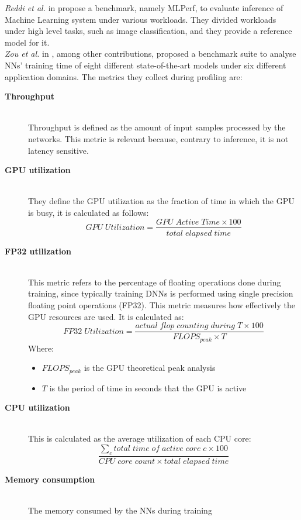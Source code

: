 \textit{Reddi et al.} in  \cite{reddi2020mlperf} propose a benchmark, namely MLPerf, to evaluate inference of Machine Learning system under various workloads. They divided workloads under high level tasks, such as image classification, and they provide a reference model for it. \\
\textit{Zou et al. } in \cite{8573476}, among other contributions, proposed a benchmark suite to analyse NNs' training time of eight different state-of-the-art models under six different application domains. The metrics they collect during profiling are:
\begin{description}
  \item[\textbf{Throughput}] \hfill\\ Throughput is defined as the amount of input samples processed by the networks. This metric is relevant because, contrary to inference, it is not latency sensitive.   
  \item[\textbf{GPU utilization}] \hfill \\ They define the GPU utilization as the fraction of time in which the GPU is busy, it is calculated as follows:
  \begin{equation}
      GPU\;Utilization = \dfrac{GPU\;Active\;Time\times100}{total\;elapsed\;time}%
  \end{equation}
  
  \item[\textbf{FP32 utilization}] \hfill \\ This metric refers to the percentage of floating operations done during training, since typically training DNNs is performed using single precision floating point operations (FP32). This metric measures how effectively the GPU resources are used. It is calculated as:
  \begin{equation}
      FP32\;Utilization = \dfrac{actual\;flop\;counting\;during\;T\times100}{FLOPS_{peak} \times T}%
  \end{equation}
  Where:
  \begin{itemize}
  \item $FLOPS_{peak}$ is the GPU theoretical peak analysis
  \item $T$ is the period of time in seconds that the GPU is active
  \end{itemize}
  \item[\textbf{CPU utilization }] \hfill\\ This is calculated as the average utilization of each CPU core:
  \begin{equation}
      \dfrac{\sum_{c} total\;time\;of\;active\;core\;c \times 100}{CPU\;core\;count \times total\;elapsed\;time}%
    \end{equation}   
    \item[\textbf{Memory consumption }] \hfill\\ The memory consumed by the NNs during training
\end{description}
